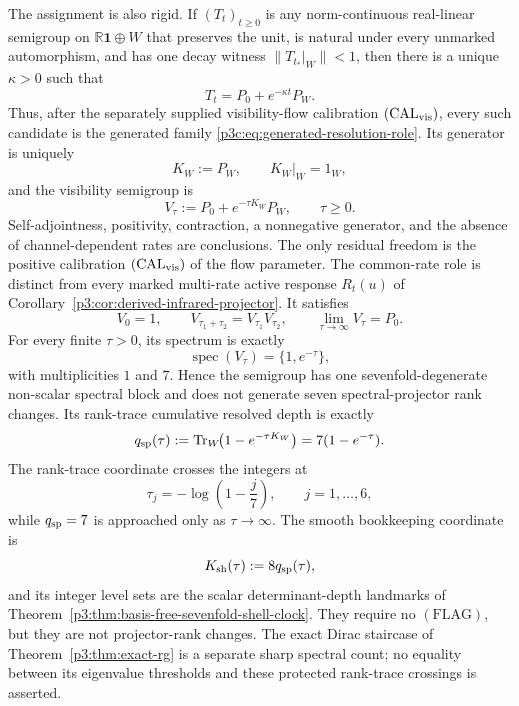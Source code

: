 \documentclass[12pt,a4paper]{article}
\begin{document}
\begin{theorem}
The assignment is also rigid.  If \((T_t)_{t\ge0}\) is any norm-continuous
real-linear semigroup on \(\mathbb R\mathbf1\oplus W\) that preserves the
unit, is natural under every unmarked automorphism, and has one decay witness
\(\|T_{t_*}|_W\|<1\), then there is a unique \(\kappa>0\) such that
\[
 T_t=P_0+e^{-\kappa t}P_W.
\]
Thus, after the separately supplied visibility-flow calibration
\((\mathrm{CAL}_{\rm vis})\), every such
candidate is the generated family \eqref{p3c:eq:generated-resolution-role}.
Its generator is uniquely
\begin{equation}
       K_W:=P_W,
       \qquad K_W|_W=1_W,
\end{equation}
and the visibility semigroup is
\begin{equation}
\label{p3:eq:smooth-visibility-semigroup}
 V_\tau:=P_0+e^{-\tau K_W}P_W,
 \qquad \tau\ge0.
\end{equation}
Self-adjointness, positivity, contraction, a nonnegative generator, and the
absence of channel-dependent rates are conclusions.  The only residual freedom is the positive calibration
\((\mathrm{CAL}_{\rm vis})\) of the flow parameter.  The common-rate
role is distinct from every marked multi-rate active response \(R_t(u)\) of
Corollary~\ref{p3:cor:derived-infrared-projector}.
It satisfies
\[
 V_0=1,
 \qquad
 V_{\tau_1+\tau_2}=V_{\tau_1}V_{\tau_2},
 \qquad
 \lim_{\tau\to\infty}V_\tau=P_0.
\]
For every finite \(\tau>0\), its spectrum is exactly
\[
 \operatorname{spec}(V_\tau)
 =\{1,e^{-\tau}\},
\]
with multiplicities \(1\) and \(7\).  Hence the semigroup has one
sevenfold-degenerate non-scalar spectral block and does not generate seven
spectral-projector rank changes.
Its rank-trace cumulative resolved depth is exactly
\begin{equation}
\label{p3:eq:smooth-cumulative-depth}
 q_{\rm sp}(\tau)
 :=\operatorname{Tr}_W\!\bigl(1-e^{-\tau K_W}\bigr)
 =7(1-e^{-\tau}).
\end{equation}
The rank-trace coordinate crosses the integers at
\begin{equation}
       \tau_j=-\log\!\left(1-\frac j7\right),
       \qquad j=1,\ldots,6,
\end{equation}
while \(q_{\rm sp}=7\) is approached only as \(\tau\to\infty\).  The smooth
bookkeeping coordinate is
\begin{equation}
\label{p3:eq:smooth-shell-clock}
 K_{\mathrm{sh}}(\tau):=8q_{\rm sp}(\tau),
\end{equation}
and its integer level sets are the scalar determinant-depth landmarks of
Theorem~\ref{p3:thm:basis-free-sevenfold-shell-clock}.  They require no
\((\mathrm{FLAG})\), but they are not projector-rank changes.  The exact Dirac
staircase of Theorem~\ref{p3:thm:exact-rg} is a separate sharp spectral count;
no equality between its eigenvalue thresholds and these protected
rank-trace crossings is asserted.
\end{theorem}
\end{document}
